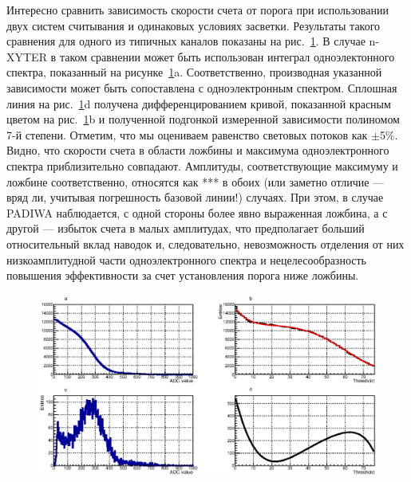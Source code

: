 Интересно сравнить зависимость скорости счета от порога при использовании двух систем считывания и одинаковых условиях засветки. Результаты такого сравнения для одного из типичных каналов показаны на рис.~\ref{fig:Blackboard}. В случае n-XYTER в таком сравнении может быть использован интеграл одноэлектонного спектра, показанный на рисунке~\ref{fig:Blackboard}a. Соответственно, производная указанной зависимости может быть сопоставлена с одноэлектронным спектром. Сплошная линия на рис.~\ref{fig:Blackboard}d получена дифференцированием кривой, показанной красным цветом на рис.~\ref{fig:Blackboard}b и полученной подгонкой измеренной зависимости полиномом 7-й степени. Отметим, что мы оцениваем равенство световых потоков как $ \pm $5\%. Видно, что скорости счета в области ложбины и максимума одноэлектронного спектра приблизительно совпадают. Амплитуды, соответствующие максимуму и ложбине соответственно, относятся как *** в обоих (или заметно отличие --- вряд ли, учитывая погрешность базовой линии!) случаях. При этом, в случае PADIWA наблюдается, с одной стороны более явно выраженная ложбина, а с другой --- избыток счета в малых амплитудах, что предполагает больший относительный вклад наводок и, следовательно, невозможность отделения от них низкоамплитудной части одноэлектронного спектра и нецелесообразность повышения эффективности за счет установления порога ниже ложбины.

\begin{figure}
\includegraphics[width=1.0\textwidth]{pictures/Blackboard.eps}
\caption{}
\label{fig:Blackboard}
\end{figure}
